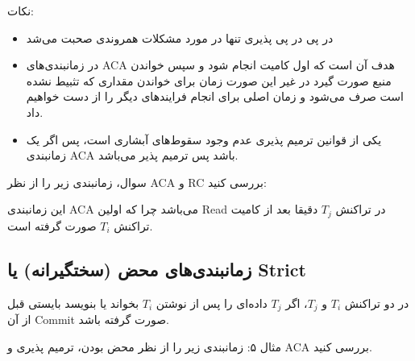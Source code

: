 \documentclass[a4paper]{article}
\begin{document}
نکات:

\begin{itemize}
    \item در پی در پی پذیری تنها در مورد مشکلات همروندی صحبت می‌شد
    \item در زمانبندی‌های ACA هدف آن است که اول کامیت انجام شود و سپس خواندن
    منبع صورت گیرد در غیر این صورت زمان برای خواندن مقداری که تثبیط نشده است صرف
    می‌شود و زمان اصلی برای انجام فرایند‌های دیگر را از دست خواهیم داد.
    \item یکی از قوانین ترمیم پذیری عدم وجود سقوط‌های آبشاری است، پس اگر یک
    زمانبندی ACA باشد پس ترمیم پذیر می‌باشد.
\end{itemize}

سوال، زمانبندی زیر را از نظر ACA و RC بررسی کنید:

\begin{LTR}
    \begin{table}[h]
        \centering
        \begin{RTL}
            \caption{بررسی زمانبندی مثال ۴}
        \end{RTL}
    \end{table}
\end{LTR}

این زمانبندی ACA می‌باشد چرا که اولین Read در تراکنش $T_j$ دقیقا بعد از کامیت
تراکنش $T_i$ صورت گرفته است.

\subsection{زمانبندی‌های محض (سختگیرانه) یا Strict}

در دو تراکنش $T_{i}$ و $T_{j}$، اگر $T_{j}$ داده‌ای را پس از نوشتن $T_{i}$
بخواند یا بنویسد بایستی قبل از آن Commit صورت گرفته باشد.

مثال ۵: زمانبندی زیر را از نظر محض بودن، ترمیم پذیری و ACA بررسی کنید.

\begin{LTR}
    \begin{table}[h]
        \centering
        \begin{RTL}
            \caption{مثال ۵: بررسی تمام لایه‌های ترمیم پذیری}
        \end{RTL}
    \end{table}
\end{LTR}
\end{document}
